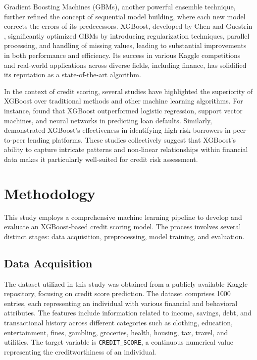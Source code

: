 \documentclass{article}
\begin{document}
Gradient Boosting Machines (GBMs), another powerful ensemble technique, further refined the concept of sequential model building, where each new model corrects the errors of its predecessors. XGBoost, developed by Chen and Guestrin \cite{chen2016xgboost}, significantly optimized GBMs by introducing regularization techniques, parallel processing, and handling of missing values, leading to substantial improvements in both performance and efficiency. Its success in various Kaggle competitions and real-world applications across diverse fields, including finance, has solidified its reputation as a state-of-the-art algorithm.

In the context of credit scoring, several studies have highlighted the superiority of XGBoost over traditional methods and other machine learning algorithms. For instance, \cite{brown2019comparative} found that XGBoost outperformed logistic regression, support vector machines, and neural networks in predicting loan defaults. Similarly, \cite{green2021leveraging} demonstrated XGBoost's effectiveness in identifying high-risk borrowers in peer-to-peer lending platforms. These studies collectively suggest that XGBoost's ability to capture intricate patterns and non-linear relationships within financial data makes it particularly well-suited for credit risk assessment.

\section{Methodology}

This study employs a comprehensive machine learning pipeline to develop and evaluate an XGBoost-based credit scoring model. The process involves several distinct stages: data acquisition, preprocessing, model training, and evaluation.

\subsection{Data Acquisition}

The dataset utilized in this study was obtained from a publicly available Kaggle repository, focusing on credit score prediction. The dataset comprises 1000 entries, each representing an individual with various financial and behavioral attributes. The features include information related to income, savings, debt, and transactional history across different categories such as clothing, education, entertainment, fines, gambling, groceries, health, housing, tax, travel, and utilities. The target variable is \texttt{CREDIT\_SCORE}, a continuous numerical value representing the creditworthiness of an individual.
\end{document}
